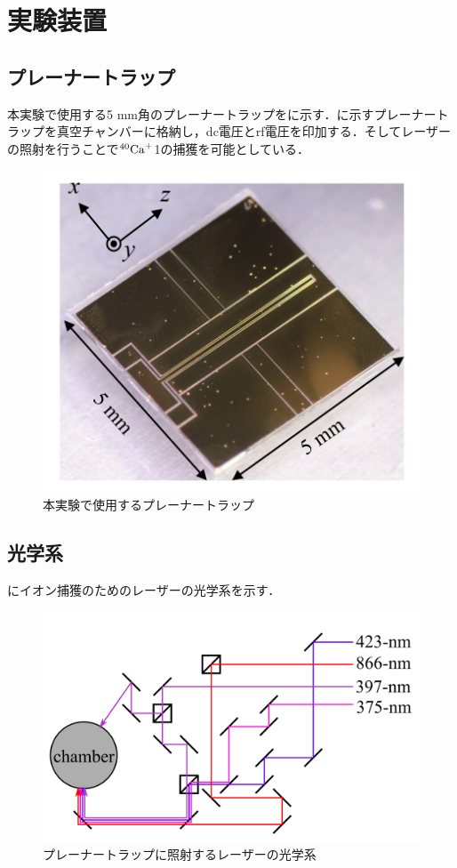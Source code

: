 \chapter{実験装置}
\section{プレーナートラップ}
本実験で使用する5 mm角のプレーナートラップをに示す．に示すプレーナートラップを真空チャンバーに格納し，dc電圧とrf電圧を印加する．そしてレーザーの照射を行うことで$^{40}{\rm Ca}^+$1の捕獲を可能としている．
\begin{figure}[h]
	\begin{center}
		\includegraphics[width = 0.4\linewidth]{./experimental_setup/figure/Using_PlannerTrap.png}
		\caption{本実験で使用するプレーナートラップ}
		\label{fig:PlanarTrap}
	\end{center}
\end{figure}

\section{光学系}
にイオン捕獲のためのレーザーの光学系を示す．
\begin{figure}[h]
	\centering
		\includegraphics[width = 0.5\linewidth]{./experimental_setup/figure/Optical_System.png}
		\caption{プレーナートラップに照射するレーザーの光学系}
		\label{fig:optical_system}
\end{figure}

